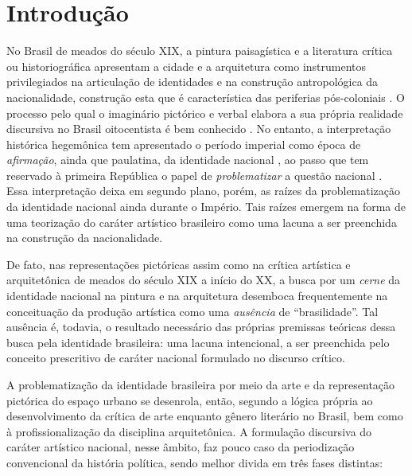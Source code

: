 \hypertarget{introduuxe7uxe3o}{%
\section{Introdução}\label{introduuxe7uxe3o}}

No Brasil de meados do século XIX, a pintura paisagística e a literatura
crítica ou historiográfica apresentam a cidade e a arquitetura como
instrumentos privilegiados na articulação de identidades e na construção
antropológica da nacionalidade, construção esta que é característica das
periferias pós-coloniais \autocite[173]{stocking:1982afterword47}. O
processo pelo qual o imaginário pictórico e verbal elabora a sua própria
realidade discursiva no Brasil oitocentista é bem conhecido
\autocite[8]{pesavento:2002imaginario}. No entanto, a interpretação
histórica hegemônica tem apresentado o período imperial como época de
\emph{afirmação}, ainda que paulatina, da identidade nacional
\autocite{wehling:1983origens338,moreira:2003historia43}, ao passo que
tem reservado à primeira República o papel de \emph{problematizar} a
questão nacional \autocite{oliveira:1990questao,bernd:1992literatura}.
Essa interpretação deixa em segundo plano, porém, as raízes da
problematização da identidade nacional ainda durante o Império. Tais
raízes emergem na forma de uma teorização do caráter artístico
brasileiro como uma lacuna a ser preenchida na construção da
nacionalidade.

De fato, nas representações pictóricas assim como na crítica artística e
arquitetônica de meados do século XIX a início do XX, a busca por um
\emph{cerne} da identidade nacional na pintura e na arquitetura
desemboca frequentemente na conceituação da produção artística como uma
\emph{ausência} de ``brasilidade''. Tal ausência é, todavia, o resultado
necessário das próprias premissas teóricas dessa busca pela identidade
brasileira: uma lacuna intencional, a ser preenchida pelo conceito
prescritivo de caráter nacional formulado no discurso crítico.

A problematização da identidade brasileira por meio da arte e da
representação pictórica do espaço urbano se desenrola, então, segundo a
lógica própria ao desenvolvimento da crítica de arte enquanto gênero
literário no Brasil, bem como à profissionalização da disciplina
arquitetônica. A formulação discursiva do caráter artístico nacional,
nesse âmbito, faz pouco caso da periodização convencional da história
política, sendo melhor divida em três fases distintas:

